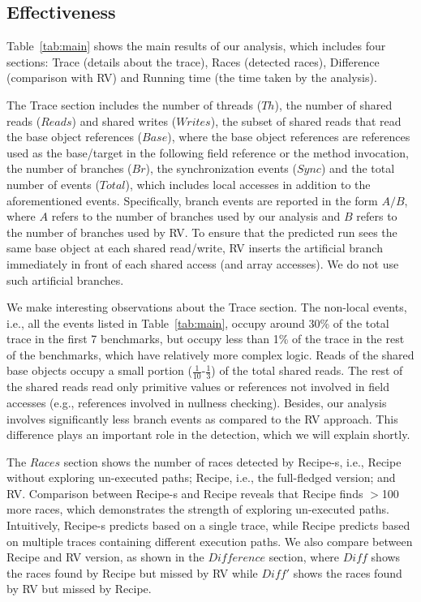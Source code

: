 







\subsection{Effectiveness}
Table~\ref{tab:main} shows the main results of our analysis, which includes four sections: Trace (details about the trace), Races (detected races), Difference (comparison with RV) and Running time (the time taken by the analysis).


The Trace section includes the number of threads ($Th$), the number of shared reads ($Reads$) and shared writes ($Writes$), the subset of shared reads that read the base object references  ($Base$), where the  base object references are references used as the base/target in the following field reference or the method invocation,  the number of branches ($Br$), the synchronization events ($Sync$) and the total number of events ($Total$), which includes local accesses in addition to the aforementioned events. Specifically, branch events are reported in the form $A/B$, where $A$ refers to the number of branches used by our analysis and $B$ refers to the number of branches used by RV. To ensure that the predicted run sees the same base object at each shared read/write, {\sf RV} inserts the artificial branch immediately in front of each shared access (and array accesses). We do not use such artificial branches.


We make interesting observations about the Trace section. The non-local events, i.e., all the events listed in Table~\ref{tab:main}, occupy around 30\% of the total trace in the first 7 benchmarks, but occupy less than 1\% of the trace in the rest of the benchmarks, which have relatively more complex logic. Reads of the shared base objects occupy a small portion ($\frac{1}{10}$-$\frac{1}{3}$) of the total shared reads. The rest of the shared reads read only primitive values or 
references not involved in field accesses (e.g., references involved in nullness checking). Besides, our analysis involves significantly less branch events as compared to the {\sf RV} approach. This difference plays an important role in the detection, which we will explain shortly.


The $Races$ section shows the number of races detected by {\sf Recipe-s}, i.e., {\sf Recipe} without exploring un-executed paths; {\sf Recipe}, i.e., the full-fledged version; and {\sf RV}. Comparison between {\sf Recipe-s} and {\sf Recipe} reveals that {\sf Recipe} finds $>$100 more races, which demonstrates the strength of exploring  un-executed paths. Intuitively,  {\sf Recipe-s} predicts based on a single trace, while {\sf Recipe} predicts based on multiple traces containing different execution paths. We also compare between {\sf Recipe} and {\sf RV} version, as shown in the $Difference$ section, where $Diff$ shows the races found by {\sf Recipe} but missed by {\sf RV} while $Diff'$ shows the races found by {\sf RV} but missed by {\sf Recipe}.

